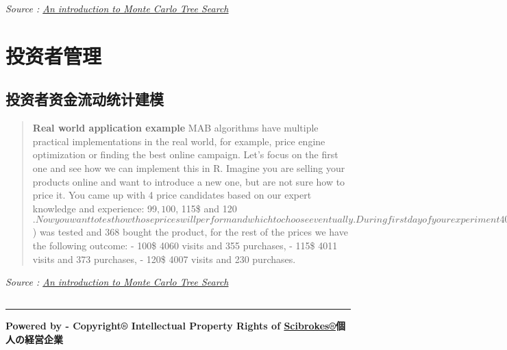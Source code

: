 \documentclass[]{book}
\theoremstyle{definition}
\theoremstyle{definition}
\theoremstyle{definition}
\theoremstyle{remark}
\begin{document}
\emph{Source :
\href{https://appsilon.com/an-introduction-to-monte-carlo-tree-search/}{An
introduction to Monte Carlo Tree Search}}

\subsection{}\label{section-2}

\section{投资者管理}

\subsection{投资者资金流动统计建模}

\begin{quote}
\textbf{Real world application example} MAB algorithms have multiple
practical implementations in the real world, for example, price engine
optimization or finding the best online campaign. Let's focus on the
first one and see how we can implement this in R. Imagine you are
selling your products online and want to introduce a new one, but are
not sure how to price it. You came up with 4 price candidates based on
our expert knowledge and experience: 99\(, 100\), 115\$ and
120\(. Now you want to test how those prices will perform and which to choose eventually. During first day of your experiment 4000 people visited your shop when the first price (99\))
was tested and 368 bought the product, for the rest of the prices we
have the following outcome: - 100\$ 4060 visits and 355 purchases, -
115\$ 4011 visits and 373 purchases, - 120\$ 4007 visits and 230
purchases.
\end{quote}

\emph{Source :
\href{https://appsilon.com/an-introduction-to-monte-carlo-tree-search/}{An
introduction to Monte Carlo Tree Search}}

\subsection{}\label{section-3}

\begin{center}\rule{0.5\linewidth}{\linethickness}\end{center}

\textbf{Powered by - Copyright® Intellectual Property Rights of
\href{http://www.scibrokes.com}{Scibrokes®}個人の経営企業}
\end{document}
